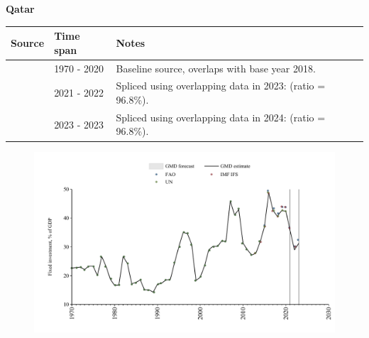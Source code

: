 \documentclass[12pt,a4paper,landscape]{article}
\begin{document}
\begin{adjustbox}{max totalsize={\paperwidth}{\paperheight},center}
\begin{minipage}[t][\textheight][t]{\textwidth}
\vspace*{0.5cm}
{}
\begin{center}
{\Large\bfseries Qatar}
\end{center}
\vspace{0.5cm}
\begin{table}[H]
\centering
\small
\begin{tabular}{|l|l|l|}
\hline
\textbf{Source} & \textbf{Time span} & \textbf{Notes} \\
\hline
\rowcolor{white}\cite{UN}& 1970 - 2020 &Baseline source, overlaps with base year 2018.\\
\rowcolor{lightgray}\cite{IMF_IFS}& 2021 - 2022 &Spliced using overlapping data in 2023: (ratio = 96.8\%).\\
\rowcolor{white}\cite{FAO}& 2023 - 2023 &Spliced using overlapping data in 2024: (ratio = 96.8\%).\\
\hline
\end{tabular}
\end{table}
\begin{figure}[H]
\centering
\includegraphics[width=\textwidth,height=0.6\textheight,keepaspectratio]{graphs/QAT_finv_GDP.pdf}
\end{figure}
\end{minipage}
\end{adjustbox}
\end{document}
